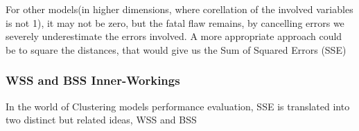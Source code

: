 \documentclass[11pt]{article}
\begin{document}
				\fi
				For other models(in higher dimensions, where corellation of the involved variables is not 1), it may not be zero, but the fatal flaw remains, by cancelling errors we severely underestimate the errors involved. A more appropriate approach could be to square the distances, that would give us the Sum of Squared Errors (SSE)\\

			\subsubsection*{WSS and BSS Inner-Workings}
				In the world of Clustering models performance evaluation, SSE is translated into two distinct but related ideas\cite{???}, WSS and BSS

\end{document}

